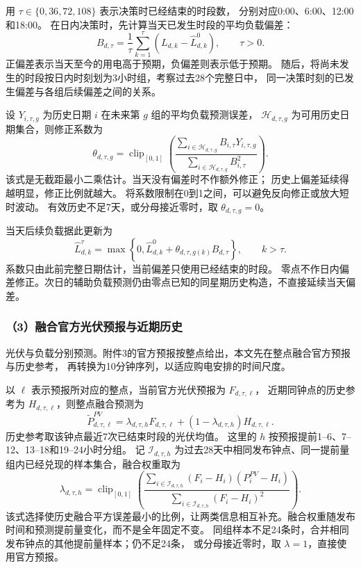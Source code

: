 用 $\tau\in\{0,36,72,108\}$ 表示决策时已经结束的时段数，
分别对应0:00、6:00、12:00和18:00。
在日内决策时，先计算当天已发生时段的平均负载偏差：
\begin{equation}
B_{d,\tau}=\frac{1}{\tau}\sum_{k=1}^{\tau}
\left(L_{d,k}-\widehat L^{0}_{d,k}\right),\qquad \tau>0.
\end{equation}
正偏差表示当天至今的用电高于预期，负偏差则表示低于预期。
随后，将尚未发生的时段按日内时刻划为3小时组，考察过去28个完整日中，
同一决策时刻的已发生偏差与各组后续偏差之间的关系。

设 $Y_{i,\tau,g}$ 为历史日期 $i$ 在未来第 $g$ 组的平均负载预测误差，
$\mathcal H_{d,\tau,g}$ 为可用历史日期集合，则修正系数为
\begin{equation}
\theta_{d,\tau,g}=\operatorname{clip}_{[0,1]}
\left(\frac{\sum_{i\in\mathcal H_{d,\tau,g}}B_{i,\tau}Y_{i,\tau,g}}
{\sum_{i\in\mathcal H_{d,\tau,g}}B_{i,\tau}^{2}}\right).
\end{equation}
该式是无截距最小二乘估计。当天没有偏差时不作额外修正；
历史上偏差延续得越明显，修正比例就越大。
将系数限制在0到1之间，可以避免反向修正或放大短时波动。
有效历史不足7天，或分母接近零时，取 $\theta_{d,\tau,g}=0$。

当天后续负载据此更新为
\begin{equation}
\widehat L_{d,k}^{\tau}
=\max\left\{0,\widehat L^{0}_{d,k}
+\theta_{d,\tau,g(k)}B_{d,\tau}\right\},\qquad k>\tau.
\end{equation}
系数只由此前完整日期估计，当前偏差只使用已经结束的时段。
零点不作日内偏差修正。次日的辅助负载预测仍由零点已知的同星期历史构造，不直接延续当天偏差。

\subsubsection*{（3）融合官方光伏预报与近期历史}

光伏与负载分别预测。附件3的官方预报按整点给出，本文先在整点融合官方预报与历史参考，
再转换为10分钟序列，以适应购电安排的时间尺度。

以 $\ell$ 表示预报所对应的整点，当前官方光伏预报为 $F_{d,\tau,\ell}$，
近期同钟点的历史参考为 $H_{d,\tau,\ell}$，则整点融合预测为
\begin{equation}
\widetilde P^{PV}_{d,\tau,\ell}
=\lambda_{d,\tau,h}F_{d,\tau,\ell}
+(1-\lambda_{d,\tau,h})H_{d,\tau,\ell}.
\end{equation}
历史参考取该钟点最近7次已结束时段的光伏均值。
这里的 $h$ 按预报提前1--6、7--12、13--18和19--24小时分组。
记 $\mathcal I_{d,\tau,h}$ 为过去28天中相同发布钟点、同一提前量组内已经兑现的样本集合，融合权重取为
\begin{equation}
\lambda_{d,\tau,h}
=\operatorname{clip}_{[0,1]}
\left(\frac{\sum_{i\in\mathcal I_{d,\tau,h}}(F_i-H_i)(P^{PV}_i-H_i)}
{\sum_{i\in\mathcal I_{d,\tau,h}}(F_i-H_i)^2}\right).
\end{equation}
该式选择使历史融合平方误差最小的比例，让两类信息相互补充。融合权重随发布时间和预测提前量变化，而不是全年固定不变。
同组样本不足24条时，合并相同发布钟点的其他提前量样本；仍不足24条，
或分母接近零时，取 $\lambda=1$，直接使用官方预报。

